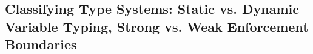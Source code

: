 \subsection{Classifying Type Systems: Static vs. Dynamic Variable Typing, Strong vs. Weak Enforcement Boundaries}
